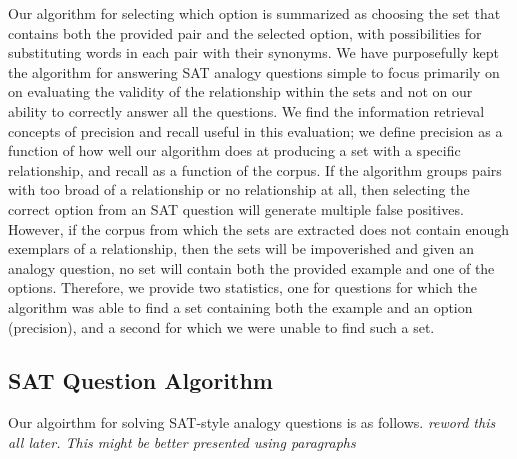\documentclass[11pt]{article}
\begin{document}
Our algorithm for selecting which option is summarized as choosing the set that
contains both the provided pair and the selected option, with possibilities for
substituting words in each pair with their synonyms.  We have purposefully kept
the algorithm for answering SAT analogy questions simple to focus primarily on
on evaluating the validity of the relationship within the sets and not on our
ability to correctly answer all the questions.  We find the information
retrieval concepts of precision and recall useful in this evaluation; we define
precision as a function of how well our algorithm does at producing a set with a
specific relationship, and recall as a function of the corpus.  If the algorithm
groups pairs with too broad of a relationship or no relationship at all, then
selecting the correct option from an SAT question will generate multiple false
positives.  However, if the corpus from which the sets are extracted does not
contain enough exemplars of a relationship, then the sets will be impoverished
and given an analogy question, no set will contain both the provided example and
one of the options.  Therefore, we provide two statistics, one for questions for
which the algorithm was able to find a set containing both the example and an
option (precision), and a second for which we were unable to find such a set.


\subsection{SAT Question Algorithm}

Our algoirthm for solving SAT-style analogy questions is as
follows. \emph{reword this all later.  This might be better presented using
  paragraphs}
\end{document}
